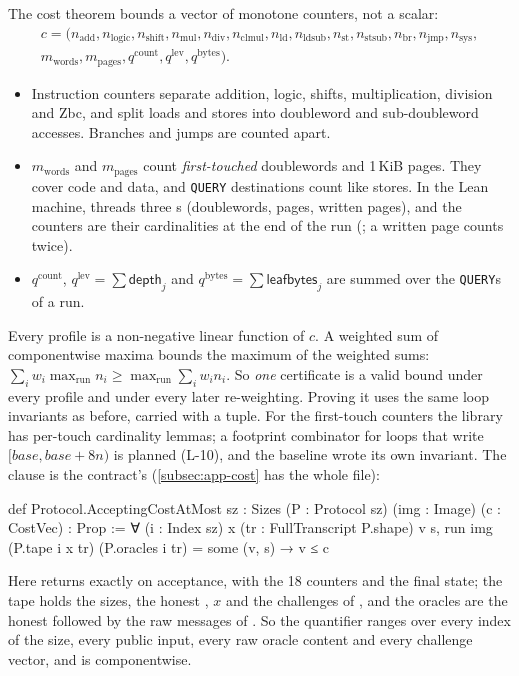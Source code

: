 The cost theorem bounds a vector of monotone counters, not a scalar:
\begin{multline*}
  c=(n_{\mathrm{add}},n_{\mathrm{logic}},n_{\mathrm{shift}},n_{\mathrm{mul}},n_{\mathrm{div}},
     n_{\mathrm{clmul}},n_{\mathrm{ld}},n_{\mathrm{ldsub}},n_{\mathrm{st}},n_{\mathrm{stsub}},
     n_{\mathrm{br}},n_{\mathrm{jmp}},n_{\mathrm{sys}},\\
     m_{\mathrm{words}},m_{\mathrm{pages}},q^{\mathrm{count}},q^{\mathrm{lev}},q^{\mathrm{bytes}}).
\end{multline*}
\begin{itemize}[nosep]
\item Instruction counters separate addition, logic, shifts, multiplication, division and Zbc, and
  split loads and stores into doubleword and sub-doubleword accesses. Branches and jumps are counted
  apart.
\item $m_{\mathrm{words}}$ and $m_{\mathrm{pages}}$ count \emph{first-touched} doublewords and 1\,KiB
  pages. They cover code and data, and \texttt{QUERY} destinations count like stores. In the Lean
  machine,  threads three s (doublewords, pages, written pages), and the
  counters are their cardinalities at the end of the run (; a written page counts twice).
\item $q^{\mathrm{count}}$, $q^{\mathrm{lev}}=\sum\mathsf{depth}_j$ and
  $q^{\mathrm{bytes}}=\sum\mathsf{leafbytes}_j$ are summed over the \texttt{QUERY}s of a run.
\end{itemize}
Every profile is a non-negative linear function of $c$. A weighted sum of componentwise maxima bounds
the maximum of the weighted sums: $\sum_iw_i\max_{\mathrm{run}}n_i\ge\max_{\mathrm{run}}\sum_iw_in_i$.
So \emph{one} certificate is a valid bound under every profile and under every later re-weighting.
Proving it uses the same loop invariants as before, carried with a tuple. For the first-touch
counters the library has per-touch cardinality lemmas; a footprint combinator for loops that write
$[\mathit{base},\mathit{base}+8n)$ is planned (L-10), and the baseline wrote its own invariant.
The clause is the contract's (\cref{subsec:app-cost} has the whole file):

\begin{leancode}[label={\footnotesize Contract/Cost.lean}]
def Protocol.AcceptingCostAtMost {sz : Sizes} (P : Protocol sz) (img : Image) (c : CostVec) : Prop :=
  ∀ (i : Index sz) x (tr : FullTranscript P.shape) v s, run img (P.tape i x tr) (P.oracles i tr) =
      some (v, s) → v ≤ c
\end{leancode}
Here  returns  exactly on acceptance, with the 18 counters and the final state;
the tape holds the sizes, the honest , $x$ and the challenges of , and the
oracles are the honest  followed by the raw messages of . So the quantifier
ranges over every index of the size, every public input, every raw oracle content and every
challenge vector, and  is componentwise.

